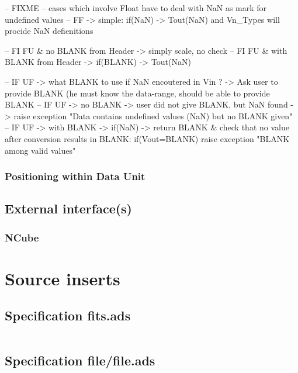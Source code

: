 \documentclass[a4paper,10pt]{article}
\begin{document}
-- FIXME
    -- cases which involve Float have to deal with NaN as mark for undefined values
    -- FF -> simple: if(NaN) -> Tout(NaN) and Vn\_Types will procide NaN defienitions

    -- FI FU \& no   BLANK from Header -> simply scale, no check
    -- FI FU \& with BLANK from Header -> if(BLANK) -> Tout(NaN)

    -- IF UF -> what BLANK to use if NaN encoutered in Vin ? -> Ask user to provide BLANK (he must know the data-range, should be able to provide BLANK
    -- IF UF -> no   BLANK -> user did not give BLANK, but NaN found -> raise exception "Data contains undefined values (NaN) but no BLANK given"
    -- IF UF -> with BLANK -> if(NaN) -> return BLANK \& check that no value after conversion results in BLANK: if(Vout=BLANK) raise exception "BLANK among valid values"





\subsubsection{Positioning within Data Unit}




\subsection{External interface(s)}
\subsubsection{NCube}







\section{Source inserts}

\subsection{Specification fits.ads}
\inputminted[linenos, fontsize=\footnotesize]{ada}{../lib/src/fits.ads}

\subsection{Specification file/file.ads}
\inputminted[linenos, fontsize=\footnotesize]{ada}{../lib/src/file/file.ads}
\end{document}
